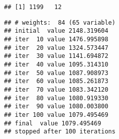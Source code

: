 \documentclass{article}
\begin{document}
\begin{verbatim}
## [1] 1199   12
\end{verbatim}

\begin{Shaded}
\begin{Highlighting}[]
\OtherTok{=} \NormalTok{(}\SpecialCharTok{\textasciitilde{}}
\OtherTok{=} \NormalTok{(}\SpecialCharTok{\textasciitilde{}}

\OtherTok{=} 
\OtherTok{=} 

\OtherTok{=} \SpecialCharTok{\textasciitilde{}} \NormalTok{)}
\end{Highlighting}
\end{Shaded}

\begin{verbatim}
## # weights:  84 (65 variable)
## initial  value 2148.319604 
## iter  10 value 1476.995898
## iter  20 value 1324.573447
## iter  30 value 1141.694872
## iter  40 value 1095.314310
## iter  50 value 1087.908973
## iter  60 value 1085.261873
## iter  70 value 1083.342120
## iter  80 value 1080.919330
## iter  90 value 1080.003800
## iter 100 value 1079.495469
## final  value 1079.495469 
## stopped after 100 iterations
\end{verbatim}

\begin{Shaded}
\begin{Highlighting}[]
\OtherTok{=} 

\OtherTok{=} \SpecialCharTok{==}\SpecialCharTok{$}

\NormalTok{(}\NormalTok{(}
\end{Highlighting}
\end{Shaded}
\end{document}
